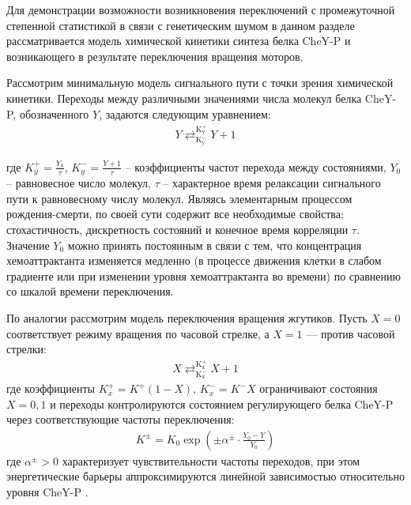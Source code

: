 Для демонстрации возможности возникновения переключений с промежуточной степенной статистикой в связи с генетическим шумом в данном разделе рассматривается модель химической кинетики синтеза белка CheY-P и возникающего в результате переключения вращения моторов. 

Рассмотрим минимальную модель сигнального пути с точки зрения химической кинетики. Переходы между различными значениями числа молекул белка CheY-P, обозначенного $Y$, задаются следующим уравнением:
\begin{equation}
    \begin{aligned}
        Y \mathrel{\mathop{\rightleftarrows}^{\mathrm{K_{y}^{+}}}_{\mathrm{K_{y}^{-}}}} Y + 1
    \label{eq:chem}
    \end{aligned}
\end{equation}

где $K_{y}^{+}=\frac{Y_0}{\tau}$, $K_{y}^{-}=\frac{Y+1}{\tau}$ -- коэффициенты частот перехода между состояниями, $Y_0$ -- равновесное число молекул, $\tau$ -- характерное время релаксации сигнального пути к равновесному числу молекул. Являясь элементарным процессом рождения-смерти, по своей сути содержит все необходимые свойства: стохастичность, дискретность состояний и конечное время корреляции $\tau$. Значение $Y_0$ можно принять постоянным в связи с тем, что концентрация хемоаттрактанта изменяется медленно (в процессе движения клетки в слабом градиенте или при изменении уровня хемоаттрактанта во времени) по сравнению со шкалой времени переключения. 

По аналогии рассмотрим модель переключения вращения жгутиков. Пусть $X = 0$ соответствует режиму вращения по часовой стрелке, а $X = 1$ — против часовой стрелки:
\begin{equation}
    \begin{aligned}
        X \mathrel{\mathop{\rightleftarrows}^{\mathrm{K_{x}^{+}}}_{\mathrm{K_{x}^{-}}}} X + 1
    \label{eq:turning}
    \end{aligned}
\end{equation}
где коэффициенты $K_x^{+}=K^{+}(1-X)$, $K_x^{-}=K^{-}X$ ограничивают состояния $X={0, 1}$ и переходы контролируются состоянием регулирующего белка CheY-P через соответствующие частоты переключения:
\begin{equation}
    \begin{aligned}
        K^{\pm}=K_0 \exp(\pm\alpha^\pm \cdot \frac{Y_0-Y}{Y_0})
    \label{eq:turning-rates}
    \end{aligned}
\end{equation}
где $\alpha^\pm>0$ характеризует чувствительности частоты переходов, при этом энергетические барьеры аппроксимируются линейной зависимостью относительно уровня CheY-P \cite{khan_steady-state_1980}.

